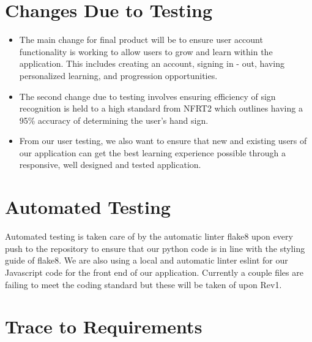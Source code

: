 \documentclass[12pt, titlepage]{article}
\begin{document}
\section{Changes Due to Testing}

\begin{itemize}
    \item The main change for final product will be to ensure user account functionality is working to allow users to grow and learn within the application. This includes creating an account, signing in - out, having personalized learning, and progression opportunities.

    \item The second change due to testing involves ensuring efficiency of sign recognition is held to a high standard from NFRT2 which outlines having a 95\% accuracy of determining the user's hand sign.

    \item From our user testing, we also want to ensure that new and existing users of our application can get the best learning experience possible through a responsive, well designed and tested application.
\end{itemize}

\section{Automated Testing}

Automated testing is taken care of by the automatic linter flake8 upon every push to the repository to ensure that our python code is in line with the styling guide of flake8. We are also using a local and automatic linter eslint for our Javascript code for the front end of our application. Currently a couple files are failing to meet the coding standard but these will be taken of upon Rev1.

\section{Trace to Requirements}
\end{document}
